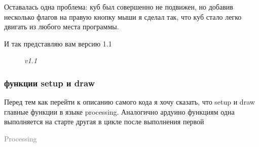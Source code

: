 \documentclass[a4paper, 12pt]{article}
\newcommand{\image}[3]{
	\begin{figure}[ht]
		\center{\texttt{[image: img/\#1]} }
		\caption{\textit{#3}}\end{figure}
}
\begin{document}
Оставалась одна проблема: куб был совершенно не подвижен, но добавив несколько
флагов на правую кнопку мыши я сделал так, что куб стало легко двигать из
любого места программы.

И так представляю вам версию 1.1

\image{v1.1.png}{250}{v1.1}

\subsubsection{функции setup и draw}

Перед тем как перейти к описанию самого кода я хочу сказать, что setup и draw
главные функции в языке processing. Аналогично ардуино функциям одна
выполняется на старте другая в цикле после выполнения первой


\newpage
\begin{flushright}\begin{huge}\textcolor{grey}{Processing}\end{huge}\end{flushright}
\end{document}
